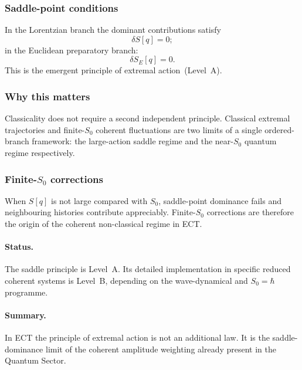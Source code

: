 \subsubsection*{Saddle-point conditions}

In the Lorentzian branch the dominant contributions satisfy
\begin{equation}
  \label{eq:qs_saddle}
  \delta S[q] = 0;
\end{equation}
in the Euclidean preparatory branch:
\begin{equation}
  \label{eq:qs_saddle_E}
  \delta S_E[q] = 0.
\end{equation}
This is the emergent principle of extremal action~(Level~A).

\subsubsection*{Why this matters}

Classicality does not require a second independent principle.
Classical extremal trajectories and finite-$S_0$ coherent fluctuations
are two limits of a single ordered-branch framework: the large-action
saddle regime and the near-$S_0$ quantum regime respectively.

\subsubsection*{Finite-$S_0$ corrections}

When $S[q]$ is not large compared with $S_0$, saddle-point dominance
fails and neighbouring histories contribute appreciably.
Finite-$S_0$ corrections are therefore the origin of the coherent
non-classical regime in ECT.

\paragraph{Status.}
The saddle principle is Level~A.
Its detailed implementation in specific reduced coherent systems is
Level~B, depending on the wave-dynamical and $S_0=\hbar$ programme.

\paragraph{Summary.}
In ECT the principle of extremal action is not an additional law.
It is the saddle-dominance limit of the coherent amplitude weighting
already present in the Quantum Sector.


